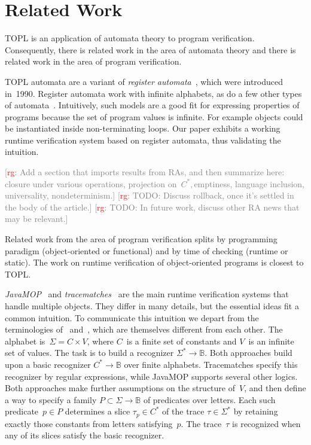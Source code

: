 \documentclass[9pt, preprint]{sigplanconf} %
\newcommand{\noterg}[2]{\textcolor{gray}{[\textcolor{red}{#1}: #2]}}
\newcommand{\rg}[1]{\noterg{rg}{#1}}
\newcommand{\B}{\ensuremath{\mathbb{B}}}
\theoremstyle{definition}
\theoremstyle{remark}
\begin{document}
\section{Related Work}\label{sec:related} %

TOPL is an application of automata theory to program verification.
Consequently, there is related work in the area of automata theory and there is related work in the area of program verification.

TOPL automata are a variant of {\it register automata\/}~\cite{dblp:conf/focs/kaminskif90}, which were introduced in~1990.
Register automata work with infinite alphabets, as do a few other types of automata~\cite{dblp:conf/csl/segoufin06}.
Intuitively, such models are a good fit for expressing properties of programs because the set of program values is infinite.
For example objects could be instantiated inside non-terminating loops.
Our paper exhibits a working runtime verification system based on register automata, thus validating the intuition.

\rg{Add a section that imports results from RAs, and then summarize here:
closure under various operations, projection on~$C^*, $emptiness, language inclusion, universality, nondeterminism.}
\rg{TODO: Discuss rollback, once it's settled in the body of the article.}
\rg{TODO: In future work, discuss other RA news that may be relevant.}

Related work from the area of program verification splits by programming paradigm (object-oriented or functional) and by time of checking (runtime or static).
The work on runtime verification of object-oriented programs is closest to TOPL\null.

{\it JavaMOP\/}~\cite{dblp:journals/sttt/meredithjgcr12} and {\it tracematches\/}~\cite{dblp:conf/oopsla/allanachklmsst05} are the main runtime verification systems that handle multiple objects.
They differ in many details, but the essential ideas fit a common intuition.
To communicate this intuition we depart from the terminologies of \cite{dblp:journals/sttt/meredithjgcr12}~and~\cite{dblp:conf/oopsla/allanachklmsst05}, which are themselves different from each other.
The alphabet is~$\Sigma=C\times V$, where $C$~is a finite set of constants and $V$~is an infinite set of values.
The task is to build a recognizer $\Sigma^*\to\B$.
Both approaches build upon a basic recognizer $C^*\to\B$ over finite alphabets.
Tracematches specify this recognizer by regular expressions, while JavaMOP supports several other logics.
Both approaches make further assumptions on the structure of~$V$, and then define a way to specify a family $P\subset\Sigma\to\B$ of predicates over letters.
Each such predicate~$p\in P$ determines a slice $\tau_p\in C^*$ of the trace $\tau\in\Sigma^*$ by retaining exactly those constants from letters satisfying~$p$.
The trace~$\tau$ is recognized when any of its slices satisfy the basic recognizer.
\end{document}
